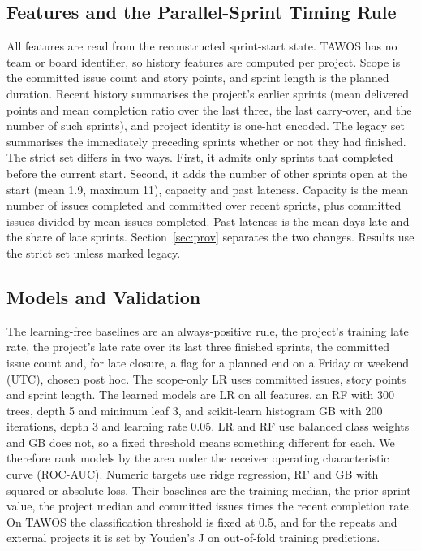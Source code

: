 \documentclass[conference]{IEEEtran}
\begin{document}
\subsection{Features and the Parallel-Sprint Timing Rule}

All features are read from the reconstructed sprint-start state. TAWOS has no team or board identifier, so history features are computed per project. Scope is the committed issue count and story points, and sprint length is the planned duration. Recent history summarises the project's earlier sprints (mean delivered points and mean completion ratio over the last three, the last carry-over, and the number of such sprints), and project identity is one-hot encoded. The legacy set summarises the immediately preceding sprints whether or not they had finished. The strict set differs in two ways. First, it admits only sprints that completed before the current start. Second, it adds the number of other sprints open at the start (mean 1.9, maximum 11), capacity and past lateness. Capacity is the mean number of issues completed and committed over recent sprints, plus committed issues divided by mean issues completed. Past lateness is the mean days late and the share of late sprints. Section~\ref{sec:prov} separates the two changes. Results use the strict set unless marked legacy.

\subsection{Models and Validation}
\label{sec:val}

The learning-free baselines are an always-positive rule, the project's training late rate, the project's late rate over its last three finished sprints, the committed issue count and, for late closure, a flag for a planned end on a Friday or weekend (UTC), chosen post hoc. The scope-only LR uses committed issues, story points and sprint length. The learned models are LR on all features, an RF \cite{r17} with 300 trees, depth 5 and minimum leaf 3, and scikit-learn \cite{r18} histogram GB with 200 iterations, depth 3 and learning rate 0.05. LR and RF use balanced class weights and GB does not, so a fixed threshold means something different for each. We therefore rank models by the area under the receiver operating characteristic curve (ROC-AUC). Numeric targets use ridge regression, RF and GB with squared or absolute loss. Their baselines are the training median, the prior-sprint value, the project median and committed issues times the recent completion rate. On TAWOS the classification threshold is fixed at 0.5, and for the repeats and external projects it is set by Youden's J on out-of-fold training predictions.
\end{document}
